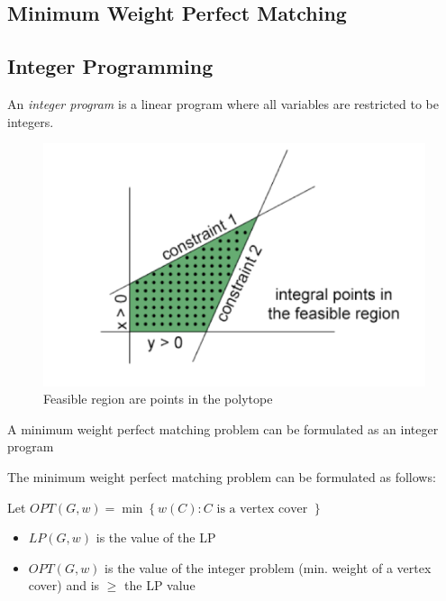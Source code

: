 \documentclass[../notes.tex]{subfiles}
\begin{document}
\subsection{Minimum Weight Perfect Matching}

\subsection{Integer Programming}

\begin{definition}
    An \textit{integer program} is a linear program where all variables are restricted to be integers.

    \begin{figure}[H]
        \centering
        \includegraphics[width=0.8\linewidth]{img/image_2023-03-31-12-33-41.png}
        \caption{Feasible region are points in the polytope}
    \end{figure}

\end{definition}




A minimum weight perfect matching problem can be formulated as an integer program




The minimum weight perfect matching problem can be formulated as follows:


Let $ OPT(G, w) = \min \left\{  w(C): C \text{ is a vertex cover } \right\}  $



\begin{itemize}
    \item $ LP(G, w) $ is the value of the LP
    \item $ OPT(G, w) $ is the value of the integer problem (min. weight of a vertex cover) and is $ \ge  $ the LP value
\end{itemize}
\end{document}
